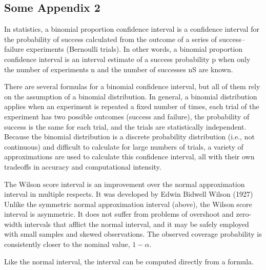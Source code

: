 \documentclass[../Thesis-IJspeert.tex]{subfiles}
\begin{document}
\begin{appendices}
\chapter{Some Appendix 2}
In statistics, a binomial proportion confidence interval is a confidence interval for the probability of success calculated from the outcome of a series of success–failure experiments (Bernoulli trials). In other words, a binomial proportion confidence interval is an interval estimate of a success probability p when only the number of experiments n and the number of successes nS are known.

There are several formulas for a binomial confidence interval, but all of them rely on the assumption of a binomial distribution. In general, a binomial distribution applies when an experiment is repeated a fixed number of times, each trial of the experiment has two possible outcomes (success and failure), the probability of success is the same for each trial, and the trials are statistically independent. Because the binomial distribution is a discrete probability distribution (i.e., not continuous) and difficult to calculate for large numbers of trials, a variety of approximations are used to calculate this confidence interval, all with their own tradeoffs in accuracy and computational intensity. 

The Wilson score interval is an improvement over the normal approximation interval in multiple respects. It was developed by Edwin Bidwell Wilson (1927) Unlike the symmetric normal approximation interval (above), the Wilson score interval is asymmetric. It does not suffer from problems of overshoot and zero-width intervals that afflict the normal interval, and it may be safely employed with small samples and skewed observations. The observed coverage probability is consistently closer to the nominal value, $1-\alpha$.

Like the normal interval, the interval can be computed directly from a formula.


\end{appendices}
\end{document}
